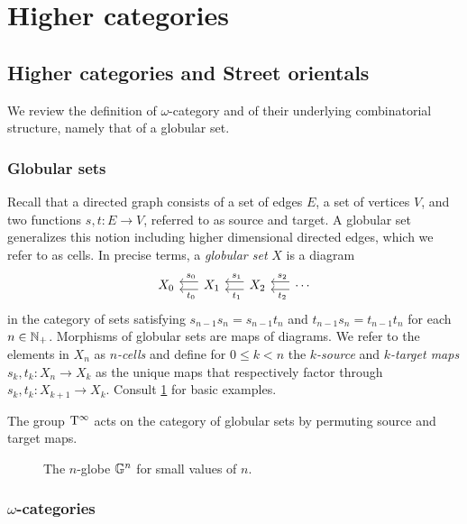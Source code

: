 
\appendix
\section{Higher categories}\label{s:categories}

\subsection{Higher categories and Street orientals}

We review the definition of $\omega$-category and of their underlying combinatorial structure, namely that of a globular set.

\subsubsection{Globular sets}

Recall that a directed graph consists of a set of edges $E$, a set of vertices $V$, and two functions $s,t \colon E \to V$, referred to as source and target.
A globular set generalizes this notion including higher dimensional directed edges, which we refer to as cells.
In precise terms, a \textit{globular set} $X$ is a diagram
\[
\begin{tikzcd}[column sep=15pt]
	X_0 & \arrow[l,"\ s_0"',shift right=3pt] \arrow[l,"\ t_0",shift left=3pt] X_1
	& \arrow[l,"\ s_1"',shift right=3pt] \arrow[l,"\ t_1",shift left=3pt] X_2
	& \arrow[l,"\ s_2"',shift right=3pt] \arrow[l,"\ t_2",shift left=3pt] \dotsb
\end{tikzcd}
\]
in the category of sets satisfying $s_{n-1}s_n = s_{n-1}t_n$ and $t_{n-1}s_n = t_{n-1}t_n$ for each $n \in \mathbb{N}_+$.
Morphisms of globular sets are maps of diagrams.
We refer to the elements in $X_n$ as \textit{$n$-cells} and define for $0 \leq k < n$ the \textit{$k$-source} and \textit{$k$-target maps} $s_k,t_k \colon X_n \to X_k$ as the unique maps that respectively factor through $s_k,t_k \colon X_{k+1} \to X_k$.
Consult \cref{f:globes} for basic examples.

The group $\mathrm{T}^\infty$ acts on the category of globular sets by permuting source and target maps.

\begin{figure}
	
	\caption{The $n$-globe $\mathbb{G}^n$ for small values of $n$.}
	\label{f:globes}
\end{figure}

\subsubsection{$\omega$-categories}

